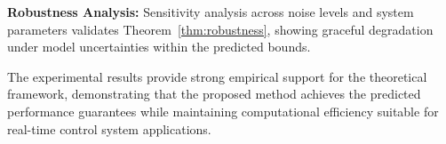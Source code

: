 \textbf{Robustness Analysis:} Sensitivity analysis across noise levels and system parameters validates Theorem~\ref{thm:robustness}, showing graceful degradation under model uncertainties within the predicted bounds.

The experimental results provide strong empirical support for the theoretical framework, demonstrating that the proposed method achieves the predicted performance guarantees while maintaining computational efficiency suitable for real-time control system applications.
